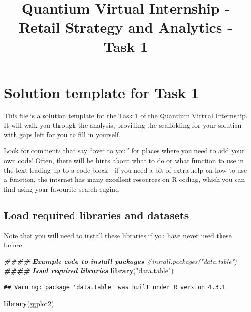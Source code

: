\documentclass[
]{article}
\title{Quantium Virtual Internship - Retail Strategy and Analytics -
Task 1}
\author{}
\date{\vspace{-2.5em}}
\newenvironment{Shaded}{\begin{snugshade}}{\end{snugshade}}
\newcommand{\CommentTok}[1]{\textcolor[rgb]{0.56,0.35,0.01}{\textit{#1}}}
\newcommand{\DocumentationTok}[1]{\textcolor[rgb]{0.56,0.35,0.01}{\textbf{\textit{#1}}}}
\newcommand{\FunctionTok}[1]{\textcolor[rgb]{0.13,0.29,0.53}{\textbf{#1}}}
\newcommand{\NormalTok}[1]{#1}
\newcommand{\StringTok}[1]{\textcolor[rgb]{0.31,0.60,0.02}{#1}}
\begin{document}
\maketitle

\hypertarget{solution-template-for-task-1}{%
\section{Solution template for Task
1}\label{solution-template-for-task-1}}

This file is a solution template for the Task 1 of the Quantium Virtual
Internship. It will walk you through the analysis, providing the
scaffolding for your solution with gaps left for you to fill in
yourself.

Look for comments that say ``over to you'' for places where you need to
add your own code! Often, there will be hints about what to do or what
function to use in the text leading up to a code block - if you need a
bit of extra help on how to use a function, the internet has many
excellent resources on R coding, which you can find using your favourite
search engine.

\hypertarget{load-required-libraries-and-datasets}{%
\subsection{Load required libraries and
datasets}\label{load-required-libraries-and-datasets}}

Note that you will need to install these libraries if you have never
used these before.

\begin{Shaded}
\begin{Highlighting}[]
\DocumentationTok{\#\#\#\# Example code to install packages}
\CommentTok{\#install.packages("data.table")}
\DocumentationTok{\#\#\#\# Load required libraries}
\FunctionTok{library}\NormalTok{(}\StringTok{"data.table"}\NormalTok{)}
\end{Highlighting}
\end{Shaded}

\begin{verbatim}
## Warning: package 'data.table' was built under R version 4.3.1
\end{verbatim}

\begin{Shaded}
\begin{Highlighting}[]
\FunctionTok{library}\NormalTok{(ggplot2)}
\end{Highlighting}
\end{Shaded}
\end{document}
